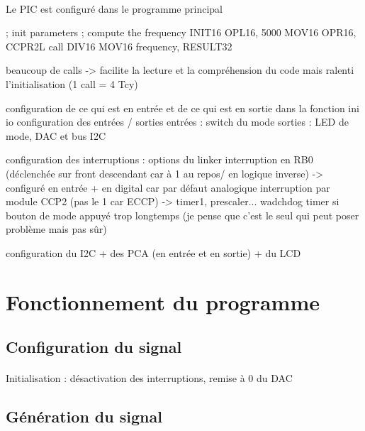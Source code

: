 \documentclass{article}
\begin{document}
    \paragraph{}



    \paragraph{}
    Le PIC est configuré dans le programme principal 

    ; init parameters
    ; compute the frequency
    INIT16	OPL16, 5000
    MOV16	OPR16, CCPR2L
    call	DIV16
    MOV16	frequency, RESULT32

    beaucoup de calls -> facilite la lecture et la compréhension du code mais ralenti l'initialisation (1 call = 4 Tcy)


    configuration de ce qui est en entrée et de ce qui est en sortie dans la fonction ini io
    configuration des entrées / sorties
    entrées : switch du mode
    sorties : LED de mode, DAC et bus I2C

    configuration des interruptions : options du linker
    interruption en RB0 (déclenchée sur front descendant car à 1 au repos/ en logique inverse) -> configuré en entrée + en digital car par défaut analogique
    interruption par module CCP2 (pas le 1 car ECCP) -> timer1, prescaler...
    wadchdog timer si bouton de mode appuyé trop longtemps (je pense que c'est le seul qui peut poser problème mais pas sûr)

    configuration du I2C + des PCA (en entrée et en sortie) + du LCD
     


    \section{Fonctionnement du programme}
    \subsection{Configuration du signal}

    \paragraph{}
    Initialisation : désactivation des interruptions, remise à 0 du DAC


    \subsection{Génération du signal}
\end{document}
